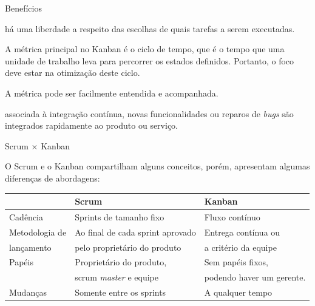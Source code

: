 \begin{frame}{\insertlecture}{Benefícios}
  \begin{description}[<+-| alert@+>]
  \item[Flexibilidade no planejamento:] há uma liberdade a respeito das
    escolhas de quais tarefas a serem executadas.
  \item[Ciclo de tempo reduzido:] A métrica principal no Kanban é o ciclo 
    de tempo, que é o tempo que uma unidade de trabalho leva para 
    percorrer os estados definidos. Portanto, o foco deve estar 
    na otimização deste ciclo.
  \item[Métrica visual:] A métrica pode ser facilmente entendida e 
    acompanhada.
  \item[Entrega contínua:] associada à integração contínua, novas
    funcionalidades ou reparos de {\it bugs} são integrados
    rapidamente ao produto ou serviço.
  \end{description}
\end{frame}

\begin{frame}{Scrum $\times$ Kanban}
  
  O Scrum e o Kanban compartilham alguns conceitos, porém, apresentam
  algumas diferenças de abordagens:

\begin{center}\footnotesize
  \begin{tabular}[h]{|l|l|l|}\hline
    & \hfil\bf\color{blue} Scrum & \hfil\bf\color{red} Kanban \\\hline\hline
    Cadência & \color{blue} Sprints de tamanho fixo & \color{red} Fluxo contínuo \\\hline
    Metodologia de &\color{blue} Ao final de cada sprint aprovado&\color{red} Entrega contínua ou \\
    lançamento     &\color{blue} pelo proprietário do produto  &\color{red} a critério da equipe\\\hline
    Papéis &\color{blue} Proprietário do produto, &\color{red} Sem papéis fixos, \\
         &\color{blue} scrum {\it master} e equipe  &\color{red} podendo haver um gerente. \\\hline
    Mudanças & \color{blue} Somente entre os sprints &\color{red} A qualquer tempo \\\hline
  \end{tabular}
\end{center}

\end{frame}

